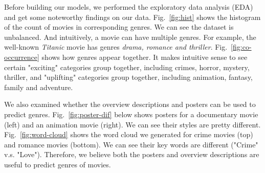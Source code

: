 \documentclass[12pt]{article} %
\begin{document}
Before building our models, we performed the exploratory data analysis (EDA) and get some noteworthy findings on our data. Fig.~\ref{fig:hist} shows the histogram of the count of movies in corresponding genres. We can see the dataset is unbalanced. And intuitively, a movie can have multiple genres. For example, the well-known {\it Titanic} movie has genres {\it drama, romance and thriller}. Fig.~\ref{fig:co-occurrence} shows how genres appear together. It makes intuitive sense to see certain "exciting" categories group together, including crimes, horror, mystery, thriller, and "uplifting" categories group together, including animation, fantasy, family and adventure.

We also examined whether the overview descriptions and posters can be used to predict genres. Fig.~\ref{fig:poster-dif} below shows posters for a documentary movie (left) and an animation movie (right). We can see their styles are pretty different. Fig.~\ref{fig:word-cloud} shows the word cloud we generated for crime movies (top) and romance movies (bottom). We can see their key words are different ("Crime" v.s. "Love"). Therefore, we believe both the posters and overview descriptions are useful to predict genres of movies.
\end{document}
